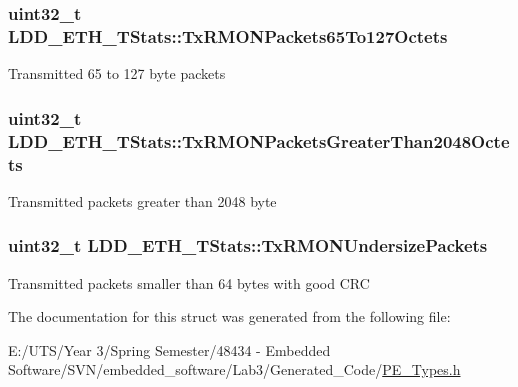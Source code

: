 \subsubsection[{Tx\+R\+M\+O\+N\+Packets65\+To127\+Octets}]{\setlength{\rightskip}{0pt plus 5cm}uint32\+\_\+t L\+D\+D\+\_\+\+E\+T\+H\+\_\+\+T\+Stats\+::\+Tx\+R\+M\+O\+N\+Packets65\+To127\+Octets}\label{struct_l_d_d___e_t_h___t_stats_afd6d14f52f7a9646e7a202abd30b4aea}
Transmitted 65 to 127 byte packets \hypertarget{struct_l_d_d___e_t_h___t_stats_a8f892961bd1e66bf6c75e6acec8d8816}{}
\subsubsection[{Tx\+R\+M\+O\+N\+Packets\+Greater\+Than2048\+Octets}]{\setlength{\rightskip}{0pt plus 5cm}uint32\+\_\+t L\+D\+D\+\_\+\+E\+T\+H\+\_\+\+T\+Stats\+::\+Tx\+R\+M\+O\+N\+Packets\+Greater\+Than2048\+Octets}\label{struct_l_d_d___e_t_h___t_stats_a8f892961bd1e66bf6c75e6acec8d8816}
Transmitted packets greater than 2048 byte \hypertarget{struct_l_d_d___e_t_h___t_stats_a71c3b9e66b78d20604a952804089a347}{}
\subsubsection[{Tx\+R\+M\+O\+N\+Undersize\+Packets}]{\setlength{\rightskip}{0pt plus 5cm}uint32\+\_\+t L\+D\+D\+\_\+\+E\+T\+H\+\_\+\+T\+Stats\+::\+Tx\+R\+M\+O\+N\+Undersize\+Packets}\label{struct_l_d_d___e_t_h___t_stats_a71c3b9e66b78d20604a952804089a347}
Transmitted packets smaller than 64 bytes with good C\+R\+C 

The documentation for this struct was generated from the following file\+:\begin{DoxyCompactItemize}
\item 
E\+:/\+U\+T\+S/\+Year 3/\+Spring Semester/48434 -\/ Embedded Software/\+S\+V\+N/embedded\+\_\+software/\+Lab3/\+Generated\+\_\+\+Code/\hyperlink{_p_e___types_8h}{P\+E\+\_\+\+Types.\+h}\end{DoxyCompactItemize}
